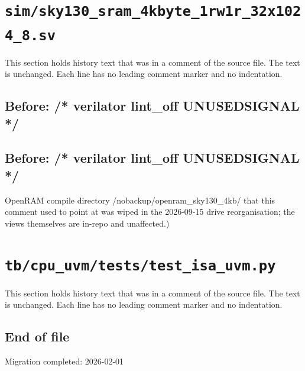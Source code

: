 \section{\texttt{sim/sky130\_sram\_4kbyte\_1rw1r\_32x1024\_8.sv}}\label{cr:suite:sim-sky130-sram-4kbyte-1rw1r-32x1024-8-sv}

This section holds history text that was in a comment of the source file. The text is unchanged. Each line has no leading comment marker and no indentation.

\begin{record}

\subsection*{Before: /* verilator lint\_off UNUSEDSIGNAL */}


\subsection*{Before: /* verilator lint\_off UNUSEDSIGNAL */}

\begin{textblock}
OpenRAM compile directory /nobackup/openram_sky130_4kb/ that this comment
used to point at was wiped in the 2026-09-15 drive reorganisation; the
views themselves are in-repo and unaffected.)
\end{textblock}

\end{record}

\section{\texttt{tb/cpu\_uvm/tests/test\_isa\_uvm.py}}\label{cr:suite:cpu-uvm-test-isa-uvm}

This section holds history text that was in a comment of the source file. The text is unchanged. Each line has no leading comment marker and no indentation.

\begin{record}

\subsection*{End of file}

\begin{textblock}
Migration completed: 2026-02-01
\end{textblock}

\end{record}

